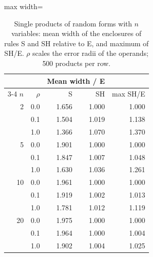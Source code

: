 \begin{table}[H]
\centering
\caption{Single products of random forms with $n$ variables: mean width of the enclosures of rules S and SH relative to E, and maximum of SH/E. $\rho$ scales the error radii of the operands; 500 products per row.}
\label{tab:random}
\small
\begin{adjustbox}{max width=\linewidth}\begin{tabular}{rrrrr}
\toprule
 & & \multicolumn{2}{c}{Mean width / E} & \\
\cmidrule(lr){3-4}
$n$ & $\rho$ & S & SH & max SH/E \\
\midrule
2 & 0.0 & 1.656 & 1.000 & 1.000 \\
 & 0.1 & 1.504 & 1.019 & 1.138 \\
 & 1.0 & 1.366 & 1.070 & 1.370 \\
\midrule
5 & 0.0 & 1.901 & 1.000 & 1.000 \\
 & 0.1 & 1.847 & 1.007 & 1.048 \\
 & 1.0 & 1.630 & 1.036 & 1.261 \\
\midrule
10 & 0.0 & 1.961 & 1.000 & 1.000 \\
 & 0.1 & 1.919 & 1.002 & 1.013 \\
 & 1.0 & 1.781 & 1.012 & 1.119 \\
\midrule
20 & 0.0 & 1.975 & 1.000 & 1.000 \\
 & 0.1 & 1.964 & 1.000 & 1.004 \\
 & 1.0 & 1.902 & 1.004 & 1.025 \\
\bottomrule
\end{tabular}\end{adjustbox}
\end{table}